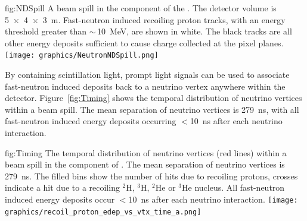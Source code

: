 \begin{dunefigure}{fig:NDSpill}
{A beam spill in the  component of the  . 
		The detector volume is \SI[product-units=repeat]{5x4x3}{\metre}.
		Fast-neutron induced recoiling proton tracks, with an energy threshold greater than $\sim\,$\SI{10}{\mega\electronvolt}, are shown in white.
		The black tracks are all other energy deposits sufficient to cause charge collected at the pixel planes.}
\texttt{[image: graphics/NeutronNDSpill.png]}
\end{dunefigure}

By containing scintillation light, prompt light signals can be used to associate fast-neutron induced deposits back to a neutrino vertex anywhere within the detector.
Figure~\ref{fig:Timing} shows the temporal distribution of neutrino vertices within a beam spill.
The mean separation of neutrino vertices is \SI{279}{\nano\second}, with all fast-neutron induced energy deposits occurring $<$\SI{10}{\nano\second} after each neutrino interaction.      

\begin{dunefigure} %
{fig:Timing}
{The temporal distribution of neutrino vertices (red lines) within a beam spill in the  component of  .
		The mean separation of neutrino vertices is \SI{279}{\nano\second}. The filled bins show the number of hits due to recoiling protons, crosses indicate a hit due to a recoiling $^{2}$H, $^3$H, $^2$He or $^3$He nucleus.
		All fast-neutron induced energy deposits occur $<$\SI{10}{\nano\second} after each neutrino interaction.}
\texttt{[image: graphics/recoil\_proton\_edep\_vs\_vtx\_time\_a.png]}
\end{dunefigure}
	

